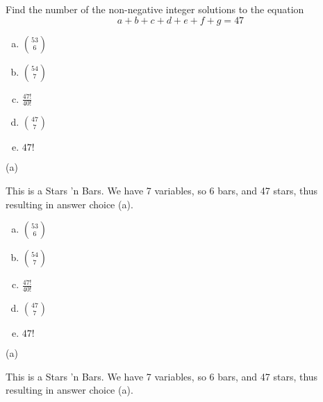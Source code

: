 Find the number of the non-negative integer solutions to the equation 
$$a + b + c + d + e + f + g = 47$$

\begin{enumerate} [(a)]
    \item $\binom{53}{6}$
    \item $\binom{54}{7}$
    \item $\frac{47!}{40!}$
    \item $\binom{47}{7}$
    \item $47!$
\end{enumerate}


\begin{solution}
(a)

This is a Stars 'n Bars. We have 7 variables, so 6 bars, and 47 stars, thus resulting in answer choice (a). 
\end{solution}
\begin{enumerate}[(a)]
	\item  $\binom{53}{6}$
    
	\item  $\binom{54}{7}$
    
	\item  $\frac{47!}{40!}$
    
	\item  $\binom{47}{7}$
    
	\item  $47!$

\end{enumerate}
\begin{solution}

(a)

This is a Stars 'n Bars. We have 7 variables, so 6 bars, and 47 stars, thus resulting in answer choice (a). 

\end{solution}


